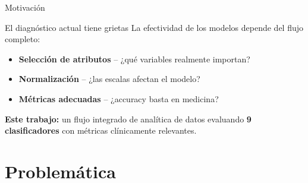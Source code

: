 \documentclass[10pt,aspectratio=169]{beamer}
\begin{document}
\begin{frame}{Motivación}
\begin{alertblock}{El diagnóstico actual tiene grietas}
La efectividad de los modelos depende del flujo completo:
\begin{itemize}
  \item \textbf{Selección de atributos} -- ¿qué variables realmente importan?
  \item \textbf{Normalización} -- ¿las escalas afectan el modelo?
  \item \textbf{Métricas adecuadas} -- ¿accuracy basta en medicina?
\end{itemize}
\end{alertblock}

\vspace{1em}
\textbf{Este trabajo:} un flujo integrado de analítica de datos evaluando \textbf{9 clasificadores} con métricas clínicamente relevantes.
\end{frame}

\section{Problemática}
\end{document}
